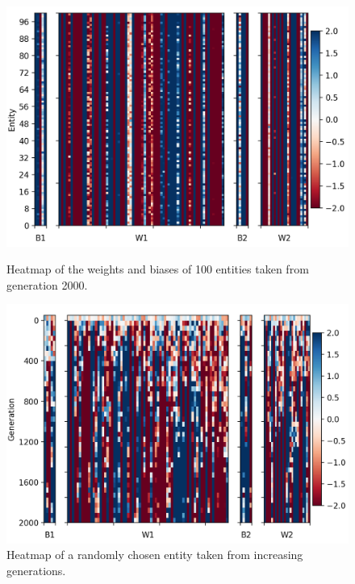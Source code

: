 \documentclass[12pt,a4paper]{report}
\begin{document}
\begin{figure}[t]
   \centering
   \begin{minipage}{0.49\textwidth}
          \centering
          \captionsetup{width=.9\linewidth}
          \includegraphics[width=1.\linewidth]{results/weights-2000-none2.png}
          \caption{Heatmap of the weights and biases of 100 entities taken from generation 2000.}
          \label{fig:weights-2000}
   \end{minipage}
   \begin{minipage}{0.49\textwidth}
          \centering
          \captionsetup{width=.9\linewidth}
          \includegraphics[width=1.\linewidth]{results/convergence.png}
          \caption{Heatmap of a randomly chosen entity taken from increasing generations.}
          \label{fig:convergence}
   \end{minipage}
\end{figure}
\end{document}
